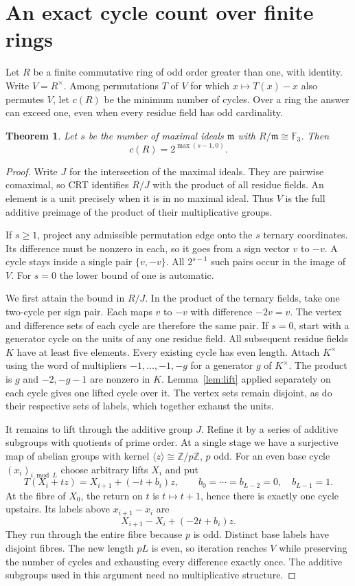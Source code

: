 \documentclass[11pt,a4paper]{article}
\newtheorem{theorem}{Theorem}[section]
\newcommand{\F}{\mathbb F}
\newcommand{\Z}{\mathbb Z}
\begin{document}
\section{An exact cycle count over finite rings}\label{sec:rings}
Let $R$ be a finite commutative ring of odd order greater than one, with identity. Write $V=R^\times$. Among permutations $T$ of $V$ for which $x\mapsto T(x)-x$ also permutes $V$, let $c(R)$ be the minimum number of cycles. Over a ring the answer can exceed one, even when every residue field has odd cardinality.
\begin{theorem}\label{thm:ring}
Let $s$ be the number of maximal ideals $\mathfrak m$ with $R/\mathfrak m\cong\F_3$. Then
\[
                        c(R)=2^{\max(s-1,0)}.
\]
\end{theorem}
\begin{proof}
Write $J$ for the intersection of the maximal ideals. They are pairwise comaximal, so CRT identifies $R/J$ with the product of all residue fields. An element is a unit precisely when it is in no maximal ideal. Thus $V$ is the full additive preimage of the product of their multiplicative groups.
\par
If $s\ge1$, project any admissible permutation edge onto the $s$ ternary coordinates. Its difference must be nonzero in each, so it goes from a sign vector $v$ to $-v$. A cycle stays inside a single pair $\{v,-v\}$. All $2^{s-1}$ such pairs occur in the image of $V$. For $s=0$ the lower bound of one is automatic.
\par
We first attain the bound in $R/J$. In the product of the ternary fields, take one two-cycle per sign pair. Each maps $v$ to $-v$ with difference $-2v=v$. The vertex and difference sets of each cycle are therefore the same pair. If $s=0$, start with a generator cycle on the units of any one residue field. All subsequent residue fields $K$ have at least five elements. Every existing cycle has even length. Attach $K^\times$ using the word of multipliers $-1,\ldots,-1,-g$ for a generator $g$ of $K^\times$. The product is $g$ and $-2,-g-1$ are nonzero in $K$. Lemma~\ref{lem:lift} applied separately on each cycle gives one lifted cycle over it. The vertex sets remain disjoint, as do their respective sets of labels, which together exhaust the units.
\par
It remains to lift through the additive group $J$. Refine it by a series of additive subgroups with quotients of prime order. At a single stage we have a surjective map of abelian groups with kernel $\langle z\rangle\cong\Z/p\Z$, $p$ odd. For an even base cycle $(x_i)_{i\bmod L}$ choose arbitrary lifts $X_i$ and put
\[
    T(X_i+t z)=X_{i+1}+(-t+b_i)z,\qquad
        b_0=\cdots=b_{L-2}=0,\quad b_{L-1}=1 .
\]
At the fibre of $X_0$, the return on $t$ is $t\mapsto t+1$, hence there is exactly one cycle upstairs. Its labels above $x_{i+1}-x_i$ are
\[
                   X_{i+1}-X_i+(-2t+b_i)z.
\]
They run through the entire fibre because $p$ is odd. Distinct base labels have disjoint fibres. The new length $pL$ is even, so iteration reaches $V$ while preserving the number of cycles and exhausting every difference exactly once. The additive subgroups used in this argument need no multiplicative structure.
\end{proof}
\end{document}
